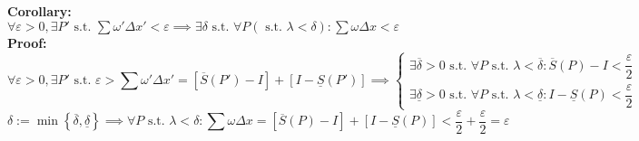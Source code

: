\documentclass{article}
\newcommand{\st}{\mbox{ s.t. }}
\newcommand{\0}{{\bf{0}}}
\begin{document}
\textbf{Corollary:} $\forall\varepsilon>0,\exists P'\st\sum\omega'\Delta x'<\varepsilon\implies\exists\delta\st\forall P(\st\lambda<\delta):\sum\omega\Delta x<\varepsilon$\\
\textbf{Proof:}
$$\forall\varepsilon>0,\exists P'\st\varepsilon>\sum\omega'\Delta x'=\left[\overline{S}(P')-I\right]+\left[I-\underline{S}(P')\right]\implies\begin{cases}
    \exists\overline{\delta}>0\st\forall P\st\lambda<\overline{\delta}:\overline{S}(P)-I<\dfrac{\varepsilon}{2}\\[6pt]
    \exists\underline{\delta}>0\st\forall P\st\lambda<\underline{\delta}:I-\underline{S}(P)<\dfrac{\varepsilon}{2}
\end{cases}$$
$$\delta:=\min\left\{\overline{\delta},\underline{\delta}\right\}\implies\forall P\st\lambda<\delta:\sum\omega\Delta x=\left[\overline{S}(P)-I\right]+\left[I-\underline{S}(P)\right]<\frac{\varepsilon}{2}+\frac{\varepsilon}{2}=\varepsilon$$
\end{document}
